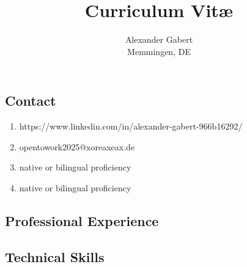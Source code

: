 \documentclass[a4paper]{report}
\begin{document}
\title{Curriculum Vitæ}
\author{Alexander Gabert\\Memmingen, DE}
\maketitle

\begin{flushleft}
\section*{Contact}
\end{flushleft}

\begin{enumerate}

\item[\textbf{Linkedin}]
                https://www.linkedin.com/in/alexander-gabert-966b16292/

\item[\textbf{Email}]
                opentowork2025@xoreaxeax.de

\item[\textbf{English}]
                native or bilingual proficiency

\item[\textbf{German}]
                native or bilingual proficiency

\end{enumerate}

\begin{flushleft}
\section*{Professional Experience}
\end{flushleft}

\subsection*{Technical Skills}
\end{document}
